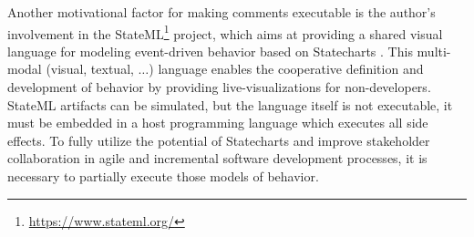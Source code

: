 Another motivational factor for making comments executable is the author's involvement in the StateML\footnote{\url{https://www.stateml.org/}} project, which aims at providing a shared visual language for modeling event-driven behavior based on Statecharts \cite{Harel:1987}.
This multi-modal (visual, textual, $\dotsc$) language enables the cooperative definition and development of behavior by providing live-visualizations for non-developers.
StateML artifacts can be simulated, but the language itself is not executable, it must be embedded in a host programming language which executes all side effects.
To fully utilize the potential of Statecharts and improve stakeholder collaboration in agile and incremental software development processes, it is necessary to partially execute those models of behavior.
